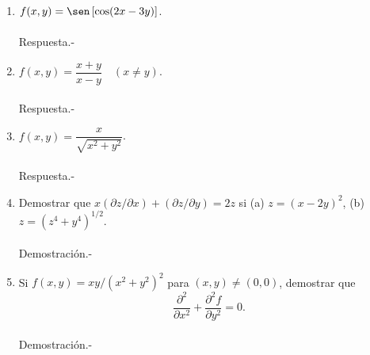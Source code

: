 \begin{enumerate}[\bfseries 1.]
    \item $f(x,y)=\sen\left[\cos(2x-3y)\right]$.\\\\
	Respuesta.-\;

    \item $f(x,y)=\dfrac{x+y}{x-y}\quad (x\neq y)$.\\\\
	Respuesta.-\;

    \item $f(x,y)=\dfrac{x}{\sqrt{x^2+y^2}}$.\\\\
	Respuesta.-\;

    \item Demostrar que $x\left(\partial z / \partial x\right)+\left(\partial z / \partial y\right)=2z$ si (a) $z=(x-2y)^2$, (b) $z=\left(z^4+y^4\right)^{1/2}$.\\\\
	Demostración.-\;

    \item Si $f(x,y)=xy/\left(x^2+y^2\right)^2$ para $(x,y)\neq (0,0)$, demostrar que
    $$\dfrac{\partial^2}{\partial x^2}+\dfrac{\partial^2 f}{\partial y^2}=0.$$\\
    	Demostración.-\; 

\end{enumerate}
